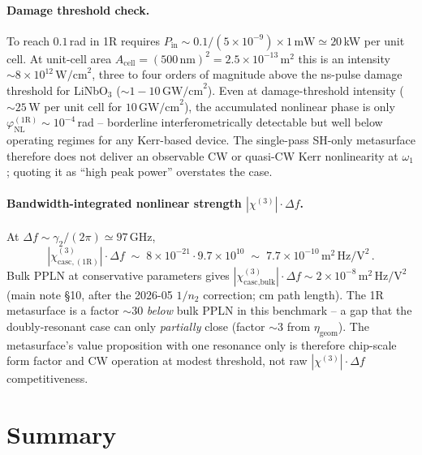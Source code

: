 \documentclass[11pt,a4paper]{article}
\newcommand{\chithree}{\chi^{(3)}}
\newcommand{\chicascOneR}{\chi^{(3)}_{\text{casc},(1\mathrm R)}}
\begin{document}
\paragraph{Damage threshold check.}
To reach $0.1$\,rad in 1R requires $P_\text{in}\sim 0.1/(5\!\times\!10^{-9})
\times 1\,\text{mW}\simeq 20\,$kW per unit cell.  At unit-cell area
$A_\text{cell}=(500\,\text{nm})^{2}=2.5\!\times\!10^{-13}\,\text{m}^{2}$
this is an intensity $\sim 8\!\times\!10^{12}\,\text{W/cm}^{2}$, three to
four orders of magnitude above the ns-pulse damage threshold for
LiNbO$_3$ ($\sim 1\!-\!10\,\text{GW/cm}^{2}$).  Even at damage-threshold
intensity ($\sim 25\,$W per unit cell for $10\,\text{GW/cm}^{2}$), the
accumulated nonlinear phase is only
$\varphi_\text{NL}^{(1\mathrm R)}\sim 10^{-4}\,$rad -- borderline
interferometrically detectable but well below operating regimes for any
Kerr-based device.  The single-pass SH-only metasurface therefore does not
deliver an observable CW or quasi-CW Kerr nonlinearity at $\omega_1$;
quoting it as ``high peak power'' overstates the case.

\paragraph{Bandwidth-integrated nonlinear strength
$|\chithree|\!\cdot\!\Delta f$.}
At $\Delta f\sim\gamma_2/(2\pi)\simeq 97\,$GHz,
\begin{equation}
  |\chicascOneR|\cdot\Delta f
   \;\sim\;8\!\times\!10^{-21}\cdot 9.7\!\times\!10^{10}
   \;\sim\;7.7\!\times\!10^{-10}\,\mathrm{m^{2}\,Hz/V^{2}}\,.
\end{equation}
Bulk PPLN at conservative parameters gives
$|\chithree_\text{casc,bulk}|\cdot\Delta f\sim 2\!\times\!10^{-8}\,
\mathrm{m^{2}\,Hz/V^{2}}$ (main note \S 10, after the 2026-05 $1/n_2$
correction; cm path length).  The 1R metasurface is a factor $\sim 30$
\emph{below} bulk PPLN in this benchmark -- a gap that the doubly-resonant
case can only \emph{partially} close (factor $\sim 3$ from $\eta_\text{geom}$).
The metasurface's value proposition with one resonance only is therefore
chip-scale form factor and CW operation at modest threshold, not raw
$|\chithree|\!\cdot\!\Delta f$ competitiveness.

\section{Summary}\label{sec:summary}
\end{document}
